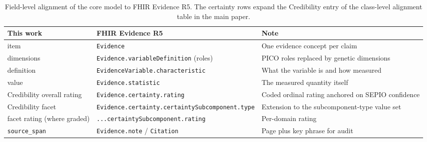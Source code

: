 \begin{table}[H]
    \centering
    \caption{Field-level alignment of the core model to FHIR Evidence R5. The certainty rows expand the Credibility entry of the class-level alignment table in the main paper.}
    \label{tab:fhir-fields}
    \small
    \begin{tabularx}{\linewidth}{@{}llX@{}}
\toprule
This work & FHIR Evidence R5 & Note \\
\midrule
\ScientificEvidence{} item        & \texttt{Evidence}                              & One evidence concept per claim \\
dimensions                         & \texttt{Evidence.variableDefinition} (roles)   & PICO roles replaced by genetic dimensions \\
\EvidenceVariable{} definition     & \texttt{EvidenceVariable.characteristic}       & What the variable is and how measured \\
\EvidenceVariable{} value          & \texttt{Evidence.statistic}                    & The measured quantity itself \\
Credibility overall rating         & \texttt{Evidence.certainty.rating}             & Coded ordinal rating anchored on SEPIO confidence \\
Credibility facet                  & \texttt{Evidence.certainty.\-certaintySubcomponent.type} & Extension to the subcomponent-type value set \\
facet rating (where graded)        & \texttt{...certaintySubcomponent.rating}       & Per-domain rating \\
\texttt{source\_span}              & \texttt{Evidence.note} / \texttt{Citation}     & Page plus key phrase for audit \\
\bottomrule
    \end{tabularx}
\end{table}
